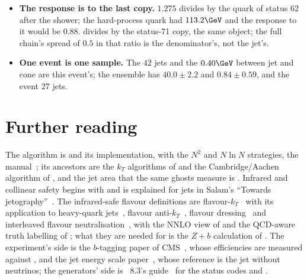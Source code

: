 \begin{itemize}
    the neutrinos of their decays are then inside the hadron, and the
    jets of that run differ from \akfour at the border by a few hundred
    MeV.
  \item \textbf{The response is to the last copy.} $1.275$ divides by
    the quark of status 62 after the shower; the hard-process quark had
    $113.2\GeV$ and the response to it would be $0.88$. \CMSSW divides by
    the status-71 copy, the same object; the full chain's spread of $0.5$
    in that ratio is the denominator's, not the jet's.
  \item \textbf{One event is one sample.} The $42$ jets and the
    $0.40\GeV$ between jet and cone are this event's; the ensemble has
    $40.0\pm2.2$ and $0.84\pm0.59$, and the \CMSSW event $27$ jets.
\end{itemize}

\section{Further reading}
\label{sec:family_photograph:further_reading}
The \antikt algorithm is \cite{Cacciari:2008gp} and its implementation,
with the $N^2$ and $N\ln N$ strategies, the \FASTJET
manual~\cite{Cacciari:2011ma}; its ancestors are the $k_T$ algorithms of
\cite{Catani:1993hr,Ellis:1993tq} and the Cambridge/Aachen algorithm of
\cite{Dokshitzer:1997in,Wobisch:1998wt}, and the jet area that the same
ghosts measure is \cite{Cacciari:2008gn}. Infrared and collinear safety
begins with \cite{Sterman:1977wj} and is explained for jets in Salam's
``Towards jetography''~\cite{Salam:2009jx}. The infrared-safe flavour
definitions are flavour-$k_T$~\cite{Banfi:2006hf} with its application to
heavy-quark jets~\cite{Banfi:2007gu}, flavour anti-$k_T$~\cite{Czakon:2022khx},
flavour dressing~\cite{Gauld:2022lem} and interleaved flavour
neutralisation~\cite{Caletti:2022glq}, with the NNLO view of
\cite{Caletti:2022hnc} and the QCD-aware truth labelling of
\cite{Buckley:2015gua}; what they are needed for is the $Z+b$
calculation of \cite{Gauld:2020deh}. The experiment's side is the
$b$-tagging paper of CMS~\cite{CMS:2017wtu}, whose efficiencies are
measured against \hadflav, and the jet energy scale
paper~\cite{CMS:2016lmd}, whose reference is the jet without neutrinos;
the generators' side is \PYTHIA~8.3's guide~\cite{Bierlich:2022pfr} for
the status codes and .

